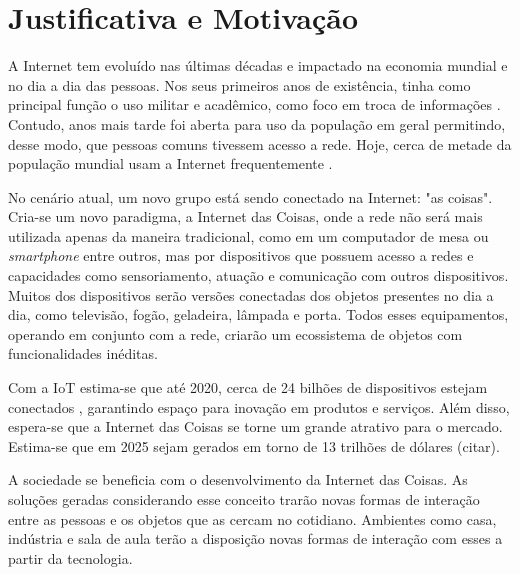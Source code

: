 \section{Justificativa e Motivação}

A Internet tem evoluído nas últimas décadas e impactado na economia mundial e no dia a dia das pessoas. Nos seus primeiros anos de existência, tinha como principal função o uso militar e acadêmico, como foco em troca de informações \cite{Leiner2012}. Contudo, anos mais tarde foi aberta para uso da população em geral permitindo, desse modo, que pessoas comuns tivessem acesso a rede. Hoje, cerca de metade da população mundial usam a Internet frequentemente \cite{MiniwattsMarketingGroup2016}. 

No cenário atual, um novo grupo está sendo conectado na Internet: "as coisas". Cria-se um novo paradigma, a Internet das Coisas, onde a rede não será mais utilizada apenas da maneira tradicional, como em um computador de mesa ou \textit{smartphone} entre outros, mas por dispositivos que possuem acesso a redes e capacidades como sensoriamento, atuação e comunicação com outros dispositivos. Muitos dos dispositivos serão versões conectadas dos objetos presentes no dia a dia, como televisão, fogão, geladeira, lâmpada e porta. Todos esses equipamentos, operando em conjunto com a rede, criarão um ecossistema de objetos com funcionalidades inéditas. 

Com a IoT estima-se que até 2020, cerca de 24 bilhões de dispositivos estejam conectados \cite{Meola2016}, garantindo espaço para inovação em produtos e serviços. Além disso, espera-se que a Internet das Coisas se torne um grande atrativo para o mercado. Estima-se que em 2025 sejam gerados em torno de 13 trilhões de dólares (citar).

A sociedade se beneficia com o desenvolvimento da Internet das Coisas. As soluções geradas considerando esse conceito trarão novas formas de interação entre as pessoas e os objetos que as cercam no cotidiano. Ambientes como casa, indústria e sala de aula terão a disposição novas formas de interação com esses a partir da tecnologia. 

